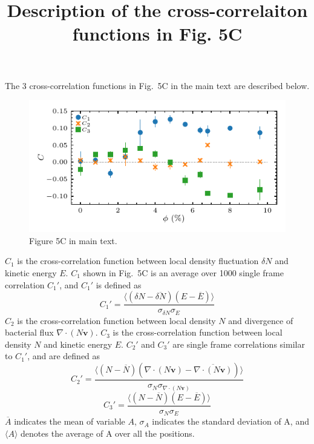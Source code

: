 \documentclass[onecolumn,aps, pre,amsmath,amssymb,longbibliography,11pt]{revtex4-2}
\begin{document}
\title{Description of the cross-correlaiton functions in Fig. 5C}

\maketitle

The 3 cross-correlation functions in Fig.~5C in the main text are described below.

\begin{figure}[h]
  \begin{center}
    \includegraphics[width=5in]{cross-correlations.pdf}
  \end{center}
  \caption[]{Figure 5C in main text.}
  \label{fig:orientation}
\end{figure}



$C_1$ is the cross-correlation function between local density fluctuation $\delta N$ and kinetic energy $E$.
$C_1$ shown in Fig.~5C is an average over 1000 single frame correlation $C_1'$, and $C_1'$ is defined as
\begin{equation}
  C_1' = \frac{ \langle (\delta N-\overline{\delta N})(E-\overline E) \rangle }{\sigma_{\delta N}\sigma_E}
\end{equation}
$C_2$ is the cross-correlation function between local density $N$ and divergence of bacterial flux $\nabla\cdot(N\bm{v})$.
$C_3$ is the cross-correlation function between local density $N$ and kinetic energy $E$.
$C_2'$ and $C_3'$ are single frame correlations similar to $C_1'$, and are defined as
\begin{equation}
  C_2' = \frac{ \langle (N-\overline{N})(\nabla\cdot(N\bm{v})-\overline{\nabla\cdot(N\bm{v})} ) \rangle }{\sigma_{N}\sigma_{\nabla\cdot(N\bm{v})}}
\end{equation}
\begin{equation}
  C_3' = \frac{ \langle (N-\overline N)(E-\overline E) \rangle }{\sigma_N\sigma_E}
\end{equation}
$\overline A$ indicates the mean of variable $A$, $\sigma_A$ indicates the standard deviation of A, and $\langle A \rangle$ denotes the average of A over all the positions.
\end{document}
